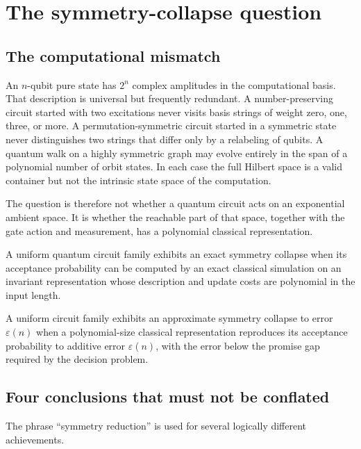 \chapter{The symmetry-collapse question}
\label{ch:question}

\section{The computational mismatch}
An $n$-qubit pure state has $2^n$ complex amplitudes in the computational basis. That description is universal but frequently redundant. A number-preserving circuit started with two excitations never visits basis strings of weight zero, one, three, or more. A permutation-symmetric circuit started in a symmetric state never distinguishes two strings that differ only by a relabeling of qubits. A quantum walk on a highly symmetric graph may evolve entirely in the span of a polynomial number of orbit states. In each case the full Hilbert space is a valid container but not the intrinsic state space of the computation.

The question is therefore not whether a quantum circuit acts on an exponential ambient space. It is whether the reachable part of that space, together with the gate action and measurement, has a polynomial classical representation.

\begin{definition}
A uniform quantum circuit family exhibits an exact symmetry collapse when its acceptance probability can be computed by an exact classical simulation on an invariant representation whose description and update costs are polynomial in the input length.
\end{definition}

\begin{definition}
A uniform circuit family exhibits an approximate symmetry collapse to error $\varepsilon(n)$ when a polynomial-size classical representation reproduces its acceptance probability to additive error $\varepsilon(n)$, with the error below the promise gap required by the decision problem.
\end{definition}

\section{Four conclusions that must not be conflated}
The phrase ``symmetry reduction'' is used for several logically different achievements.

